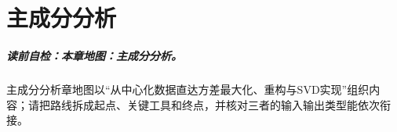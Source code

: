 
\chapter{主成分分析}\label{chap:V4-C04}

\paragraph{读前自检：本章地图：主成分分析。}主成分分析章地图以“从中心化数据直达方差最大化、重构与SVD实现”组织内容；请把路线拆成起点、关键工具和终点，并核对三者的输入输出类型能依次衔接。\par

